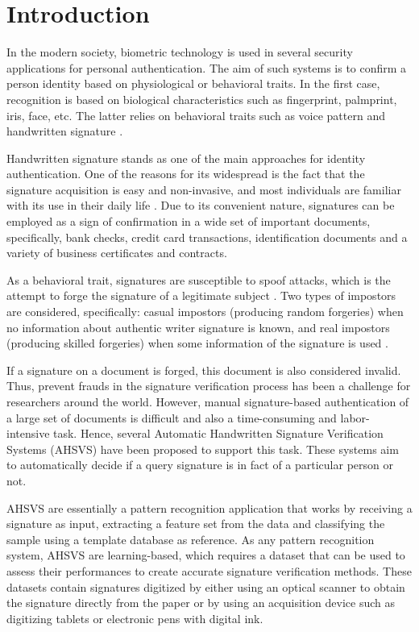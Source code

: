 
\chapter{Introduction}
In the modern society, biometric technology is used in several security applications for personal authentication. The aim of such systems is to confirm a person identity based on physiological or behavioral traits. In the first case, recognition is based on biological characteristics such as fingerprint, palmprint, iris, face, etc. The latter relies on behavioral traits such as voice pattern and handwritten signature \cite{jain2004biometrics}.

Handwritten signature stands as one of the main approaches for identity authentication. One of the reasons for its widespread is the fact that the signature acquisition is easy and non-invasive, and most individuals are familiar with its use in their daily life \cite{impedovo2008state}. Due to its convenient nature, signatures can be employed as a sign of confirmation in a wide set of important documents, specifically, bank checks, credit card transactions, identification documents and a variety of business certificates and contracts.

As a behavioral trait, signatures are susceptible to spoof attacks, which is the attempt to forge the signature of a legitimate subject \cite{jain2004biometrics}. Two types of impostors are considered, specifically: casual impostors (producing random forgeries) when no information about authentic writer signature is known, and real impostors (producing skilled forgeries) when some information of the signature is used \cite{fierrez2008handbook}.

If a signature on a document is forged, this document is also considered invalid. Thus, prevent frauds in the signature verification process has been a challenge for researchers around the world. However, manual signature-based authentication of a large set of documents is difficult and also a time-consuming and labor-intensive task. Hence, several Automatic Handwritten Signature Verification Systems (AHSVS) have been proposed to support this task. These systems aim to automatically decide if a query signature is in fact of a particular person or not.

AHSVS are essentially a pattern recognition application that works by receiving a signature as input, extracting a feature set from the data and classifying the sample using a template database as reference. As any pattern recognition system, AHSVS are learning-based, which requires a dataset that can be used to assess their performances to create accurate signature verification methods. These datasets contain signatures digitized by either using an optical scanner to obtain the signature directly from the paper or by using an acquisition device such as digitizing tablets or electronic pens with digital ink.

